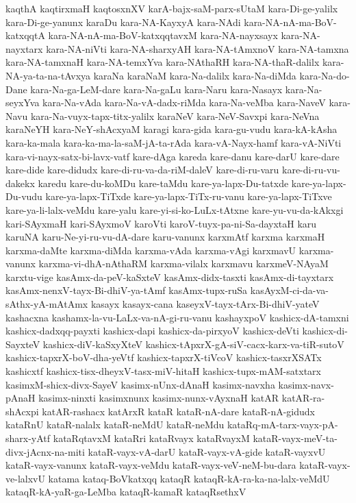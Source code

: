 {kaqthA
kaqtirxmaH
kaqtosxnXV
karA-bajx-saM-parx-sUtaM
kara-Di-ge-yalilx
kara-Di-ge-yanunx
karaDu
kara-NA-KayxyA
kara-NAdi
kara-NA-nA-ma-BoV-katxqqtA
kara-NA-nA-ma-BoV-katxqqtavxM
kara-NA-nayxsayx
kara-NA-nayxtarx
kara-NA-niVti
kara-NA-sharxyAH
kara-NA-tAmxnoV
kara-NA-tamxna
kara-NA-tamxnaH
kara-NA-temxYva
kara-NAthaRH
kara-NA-thaR-dalilx
kara-NA-ya-ta-na-tAvxya
karaNa
karaNaM
kara-Na-dalilx
kara-Na-diMda
kara-Na-do-Dane
kara-Na-ga-LeM-dare
kara-Na-gaLu
kara-Naru
kara-Nasayx
kara-Na-seyxYva
kara-Na-vAda
kara-Na-vA-dadx-riMda
kara-Na-veMba
kara-NaveV
kara-Navu
kara-Na-vuyx-tapx-titx-yalilx
karaNeV
kara-NeV-Savxpi
kara-NeVna
karaNeYH
kara-NeY-shAcxyaM
karagi
kara-gida
kara-gu-vudu
kara-kA-kAsha
kara-ka-mala
kara-ka-ma-la-saM-jA-ta-rAda
kara-vA-Nayx-hamf
kara-vA-NiVti
kara-vi-nayx-satx-bi-lavx-vatf
kare-dAga
kareda
kare-danu
kare-darU
kare-dare
kare-dide
kare-didudx
kare-di-ru-va-da-riM-daleV
kare-di-ru-varu
kare-di-ru-vu-dakekx
karedu
kare-du-koMDu
kare-taMdu
kare-ya-lapx-Du-tatxde
kare-ya-lapx-Du-vudu
kare-ya-lapx-TiTxde
kare-ya-lapx-TiTx-ru-vanu
kare-ya-lapx-TiTxve
kare-ya-li-lalx-veMdu
kare-yalu
kare-yi-si-ko-LuLx-tAtxne
kare-yu-vu-da-kAkxgi
kari-SAyxmaH
kari-SAyxmoV
karoVti
karoV-tuyx-pa-ni-Sa-dayxtaH
karu
karuNA
karu-Ne-yi-ru-vu-dA-dare
karu-vanunx
karxmAtf
karxma
karxmaH
karxma-daMte
karxma-diMda
karxma-vAda
karxma-vAgi
karxmavU
karxma-vanunx
karxma-vi-dhA-nAthaRM
karxma-vilalx
karxmavu
karxmeV-NAyaM
karxtu-vige
kasAmx-da-peV-kaSxteV
kasAmx-didx-tasxti
kasAmx-di-tayxtarx
kasAmx-nenxV-tayx-Bi-dhiV-ya-tAmf
kasAmx-tupx-ruSa
kasAyxM-ci-da-va-sAthx-yA-mAtAmx
kasayx
kasayx-cana
kaseyxV-tayx-tArx-Bi-dhiV-yateV
kashacxna
kashamx-la-vu-LaLx-va-nA-gi-ru-vanu
kashayxpoV
kashicx-dA-tamxni
kashicx-dadxqq-payxti
kashicx-dapi
kashicx-da-pirxyoV
kashicx-deVti
kashicx-di-SayxteV
kashicx-diV-kaSxyXteV
kashicx-tApxrX-gA-siV-cacx-karx-va-tiR-sutoV
kashicx-tapxrX-boV-dha-yeVtf
kashicx-tapxrX-tiVcoV
kashicx-tasxrXSATx
kashicxtf
kashicx-tisx-dheyxV-tasx-miV-hitaH
kashicx-tupx-mAM-satxtarx
kasimxM-shicx-divx-SayeV
kasimx-nUnx-dAnaH
kasimx-navxha
kasimx-navx-pAnaH
kasimx-ninxti
kasimxnunx
kasimx-nunx-vAyxnaH
katAR
katAR-ra-shAcxpi
katAR-rashacx
katArxR
kataR
kataR-nA-dare
kataR-nA-gidudx
kataRnU
kataR-nalalx
kataR-neMdU
kataR-neMdu
kataRq-mA-tarx-vayx-pA-sharx-yAtf
kataRqtavxM
kataRri
kataRvayx
kataRvayxM
kataR-vayx-meV-ta-divx-jAcnx-na-miti
kataR-vayx-vA-darU
kataR-vayx-vA-gide
kataR-vayxvU
kataR-vayx-vanunx
kataR-vayx-veMdu
kataR-vayx-veV-neM-bu-dara
kataR-vayx-ve-lalxvU
katama
kataq-BoVkatxqq
kataqR
kataqR-kA-ra-ka-na-lalx-veMdU
kataqR-kA-yaR-ga-LeMba
kataqR-kamaR
kataqRsethxV
}
